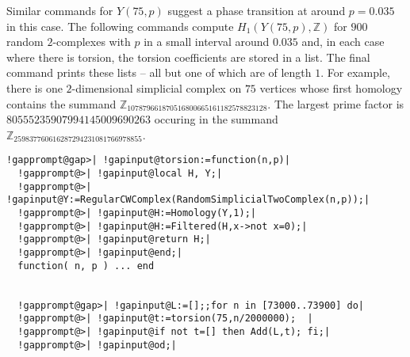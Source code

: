 \documentclass[a4paper,11pt]{report}
\begin{document}
{{Similar commands for $Y(75,p)$ suggest a phase transition at around $p=0.035$ in this case. The following commands compute $H_1(Y(75,p), \mathbb Z)$ for $900$ random $2$-complexes with $p$ in a small interval around $ 0.035$ and, in each case where there is torsion, the torsion coefficients are stored
in a list. The final command prints these lists -- all but one of which are of
length $1$. For example, there is one $2$-dimensional simplicial complex on $75$ vertices whose first homology contains the summand $\mathbb Z_{107879661870516800665161182578823128}$. The largest prime factor is $80555235907994145009690263$ occuring in the summand $\mathbb Z_{259837760616287294231081766978855}$. 
\begin{Verbatim}[commandchars=!@|,fontsize=\small,frame=single,label=Example]
  !gapprompt@gap>| !gapinput@torsion:=function(n,p)|
  !gapprompt@>| !gapinput@local H, Y;|
  !gapprompt@>| !gapinput@Y:=RegularCWComplex(RandomSimplicialTwoComplex(n,p));|
  !gapprompt@>| !gapinput@H:=Homology(Y,1);|
  !gapprompt@>| !gapinput@H:=Filtered(H,x->not x=0);|
  !gapprompt@>| !gapinput@return H;|
  !gapprompt@>| !gapinput@end;|
  function( n, p ) ... end
  
  
  !gapprompt@gap>| !gapinput@L:=[];;for n in [73000..73900] do|
  !gapprompt@>| !gapinput@t:=torsion(75,n/2000000);  |
  !gapprompt@>| !gapinput@if not t=[] then Add(L,t); fi;|
  !gapprompt@>| !gapinput@od;|
  

\end{Verbatim}}}
\end{document}
